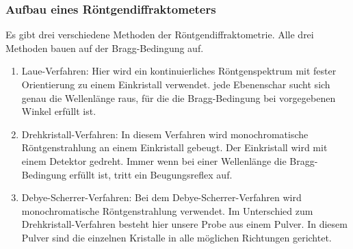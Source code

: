         \subsubsection{Aufbau eines Röntgendiffraktometers}   
            Es gibt drei verschiedene Methoden der Röntgendiffraktometrie. Alle drei Methoden bauen auf der Bragg-Bedingung auf.
            \begin{enumerate}
                \item   Laue-Verfahren: Hier wird ein kontinuierliches Röntgenspektrum mit fester Orientierung zu einem Einkristall verwendet. 
                        jede Ebenenschar sucht sich genau die Wellenlänge raus, für die die Bragg-Bedingung bei vorgegebenen Winkel erfüllt ist.
                \item   Drehkristall-Verfahren: In diesem Verfahren wird monochromatische Röntgenstrahlung an einem Einkristall gebeugt. Der Einkristall 
                        wird mit einem Detektor gedreht. Immer wenn bei einer Wellenlänge die Bragg-Bedingung erfüllt ist, tritt ein Beugungsreflex auf.
                \item   Debye-Scherrer-Verfahren: Bei dem Debye-Scherrer-Verfahren wird monochromatische Röntgenstrahlung verwendet. Im Unterschied
                        zum Drehkristall-Verfahren besteht hier unsere Probe aus einem Pulver. In diesem Pulver sind die einzelnen Kristalle in alle möglichen 
                        Richtungen gerichtet. 
            \end{enumerate}

